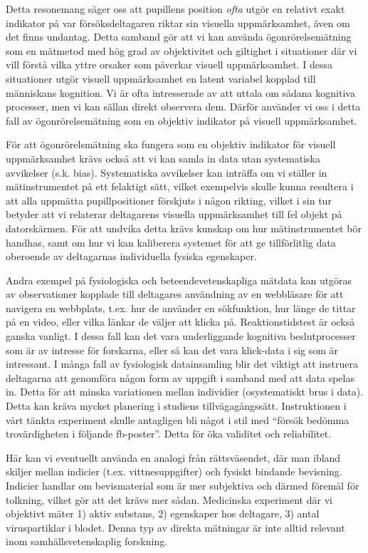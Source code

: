 \documentclass[
]{book}
\begin{document}
Detta resonemang säger oss att pupillens position \emph{ofta} utgör en relativt exakt indikator på var försöksdeltagaren riktar sin visuella uppmärksamhet, även om det finns undantag. Detta samband gör att vi kan använda ögonrörelsemätning som en mätmetod med hög grad av objektivitet och giltighet i situationer där vi vill förstå vilka yttre orsaker som påverkar visuell uppmärksamhet. I dessa situationer utgör visuell uppmärksamhet en latent variabel kopplad till människans kognition. Vi är ofta intresserade av att uttala om sådana kognitiva processer, men vi kan sällan direkt observera dem. Därför använder vi oss i detta fall av ögonrörelsemätning som en objektiv indikator på visuell uppmärksamhet.

För att ögonrörelsmätning ska fungera som en objektiv indikator för visuell uppmärksamhet krävs också att vi kan samla in data utan systematiska avvikelser (s.k. bias). Systematiska avvikelser kan inträffa om vi ställer in mätinstrumentet på ett felaktigt sätt, vilket exempelvis skulle kunna resultera i att alla uppmätta pupillpositioner förskjuts i någon rikting, vilket i sin tur betyder att vi relaterar deltagarens visuella uppmärksamhet till fel objekt på datorskärmen. För att undvika detta krävs kunskap om hur mätinstrumentet bör handhas, samt om hur vi kan kaliberera systemet för att ge tillförlitlig data oberoende av deltagarnas individuella fysiska egenskaper.

Andra exempel på fysiologiska och beteendevetenskapliga mätdata kan utgöras av observationer kopplade till deltagares användning av en webbläsare för att navigera en webbplats, t.ex. hur de använder en sökfunktion, hur länge de tittar på en video, eller vilka länkar de väljer att klicka på. Reaktionstidstest är också ganska vanligt. I dessa fall kan det vara underliggande kognitiva beslutprocesser som är av intresse för forskarna, eller så kan det vara klick-data i sig som är intressant. I många fall av fysiologisk datainsamling blir det viktigt att instruera deltagarna att genomföra någon form av uppgift i samband med att data spelas in. Detta för att minska variationen mellan individier (osystematiskt brus i data). Detta kan kräva mycket planering i studiens tillvägagångssätt. Instruktionen i vårt tänkta experiment skulle antagligen bli något i stil med ``försök bedömma trovärdigheten i följande fb-poster''. Detta för öka validitet och reliabilitet.

Här kan vi eventuellt använda en analogi från rättsväsendet, där man ibland skiljer mellan indicier (t.ex. vittnesuppgifter) och fysiskt bindande bevisning. Indicier handlar om bevismaterial som är mer subjektiva och därmed föremål för tolkning, vilket gör att det krävs mer sådan. Medicinska experiment där vi objektivt mäter 1) aktiv substans, 2) egenskaper hos deltagare, 3) antal viruspartiklar i blodet. Denna typ av direkta mätningar är inte alltid relevant inom samhällsvetenskaplig forskning.
\end{document}
